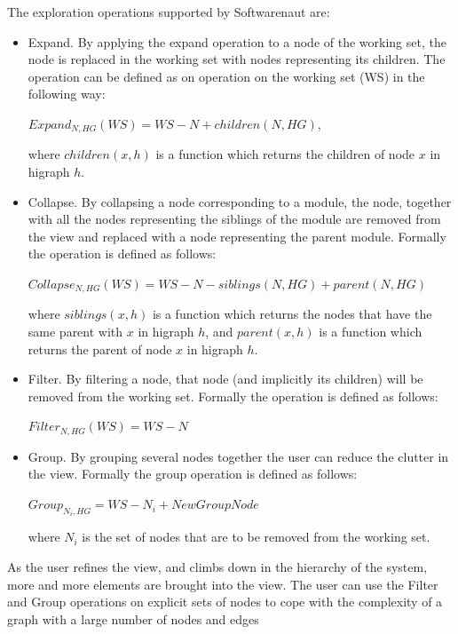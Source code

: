\documentclass[preprint,12pt]{elsarticle}
\begin{document}
The exploration operations supported by Softwarenaut are:

\begin{itemize}

\item Expand. By applying the expand operation to a node of the working set, the node is replaced in the working set with nodes representing its children. The operation can be defined as on operation on the working set (WS) in the following way:

\hspace{0.5cm} $ Expand_{N,HG} (WS) = WS - N + children (N, HG)$, 

where $children(x,h)$ is a function which returns the children of node $x$ in higraph $h$.

\item Collapse. By collapsing a node corresponding to a module, the node, together with all the nodes representing the siblings of the module are removed from the view and replaced with a node representing the parent module. Formally the operation is defined as follows:

\hspace{0.5cm} $ Collapse_{N,HG} (WS) = WS - N - siblings (N, HG) + parent (N, HG)$

where $siblings(x,h)$ is a function which returns the nodes that have the same parent with $x$ in higraph $h$, and $parent(x,h)$ is a function which returns the parent of node $x$ in higraph $h$. 

\item Filter.
By filtering a node, that node (and implicitly its children) will be removed from the working set. Formally the operation is defined as follows:

$ Filter_{N,HG} (WS) = WS - N$

\item Group.
By grouping several nodes together the user can reduce the clutter in the view. Formally the group operation is defined as follows: 

$ Group_{N_{i},HG} = WS - N_i + NewGroupNode $

where $N_i$ is the set of nodes that are to be removed from the working set.


\end{itemize}

As the user refines the view, and climbs down in the hierarchy of the system, more and more elements are brought into the view. The user can use the Filter and Group operations on explicit sets of nodes to cope with the complexity of a graph with a large number of nodes and edges 
\end{document}
